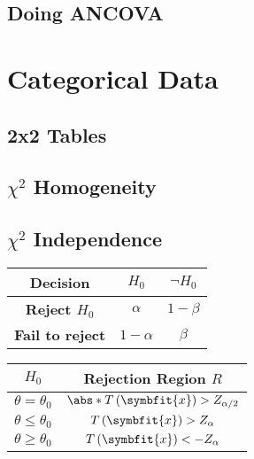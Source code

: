 \documentclass{article}
\begin{document}
\begin{multicols}{3}
\subsection{Doing ANCOVA}
\section{Categorical Data}
\subsection{2x2 Tables}
\subsection{\texorpdfstring{\(\chi^2\)}{Chi-Squared} Homogeneity}
\subsection{\texorpdfstring{\(\chi^2\)}{Chi-Squared} Independence}

\begin{minipage}{70mm}
\begin{table}[H]
    \centering
    \begin{tabular}{c|cc}
        \toprule
        \textbf{Decision}                  & \textbf{\(H_0\)}       & \textbf{\(\lnot H_0\)}      \\
        \midrule
        \textbf{Reject \(H_0\)}            & \(\alpha\)  & \(1 - \beta\)           \\
        \textbf{Fail to reject} & \(1 - \alpha\)                 & \(\beta\)  \\
        \bottomrule
    \end{tabular}
\end{table}
\end{minipage}

\begin{minipage}{70mm}
\begin{table}[H]
    \centering
    \begin{tabular}{cc}
        \toprule
        \(H_0\) & \textbf{Rejection Region} \(R\)                       \\
        \midrule
        \(\theta = \theta_0\)            & \(\abs*{T\left( \symbfit{x} \right)} > Z_{\alpha/2}\) \\
        \(\theta \leq \theta_0\)         & \(T\left( \symbfit{x} \right) > Z_{\alpha}\)          \\
        \(\theta \geq \theta_0\)         & \(T\left( \symbfit{x} \right) < -Z_{\alpha}\)         \\
        \bottomrule
    \end{tabular}
\end{table}
\end{minipage}


\end{multicols}
\end{document}
